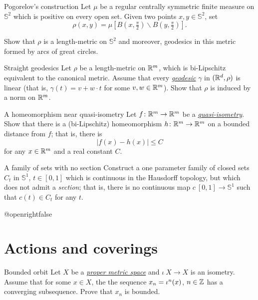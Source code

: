 \documentclass[twoside]{book}
\begin{document}
{\begin{pr}{}{Pogorelov's construction}\label{Pogorelov's construction}
Let $\mu$ be a regular centrally symmetric finite measure on $\mathbb{S}^2$ which is positive on every open set.
Given two points $x,y\in \mathbb{S}^2$,
set 
\[\rho(x,y)=\mu[B(x,\tfrac \pi2)\backslash B(y,\tfrac\pi2)].\]

Show that $\rho$ is a length-metric on $\mathbb{S}^2$
and moreover, geodesics in this metric formed by arcs of great circles.
\end{pr}

\begin{pr}{}{Straight geodesics}\label{Straight geodesics}
Let $\rho$ be a length-metric on $\mathbb{R}^m$, 
which is bi-Lipschitz equivalent to the canonical metric.
Assume that every \hyperref[Geodesic]{\emph{ge\-o\-de\-sic}} $\gamma$ in $(\mathbb{R}^d,\rho)$ is linear 
(that is, $\gamma(t)=v+w\cdot t$ for some $v,w\in\mathbb{R}^m$).
Show that $\rho$ is induced by a norm on $\mathbb{R}^m$.
\end{pr}

\begin{pr}{\thm}{A homeomorphism near quasi-isometry}\label{hom-near-QI} 
Let $f\colon\mathbb{R}^m\to\mathbb{R}^m$ be a \hyperref[Quasi-isometry]{\emph{quasi-isometry}}.
Show that there is a (bi-Lipschitz) homeomorphism 
$h\colon\mathbb{R}^m\to\mathbb{R}^m$ on a bounded distance from $f$;
that is, there is 
$$|f(x)-h(x)|\le C$$
for any $x\in\mathbb{R}^m$ and a real constant $C$.
\end{pr}

\begin{pr}{}{A family of sets with no section}\label{hausdorff-section} 
Construct a one parameter family of closed sets $C_t$ in $\mathbb{S}^1$, $t\in [0,1]$
which is continuous in the Hausdorff topology, 
but which does not admit a \emph{section};
that is, there is no continuous 
map $c\:[0,1]\to \mathbb{S}^1$ such that $c(t)\in C_t$ for any $t$.
\end{pr}





\csname @openrightfalse\endcsname
\chapter{Actions and coverings}


\begin{pr}{}{Bounded orbit}\label{Bounded orbit} Let $X$ be a 
\hyperref[Proper metric space]{\emph{proper metric space}} 
and $\iota\:X\to X$ is an isometry.
Assume that for some $x\in X$, the the sequence $x_n\z=\iota^n(x)$, $n\in\mathbb{Z}$ has a converging subsequence.
Prove that $x_n$ is bounded.
\end{pr}

}
\end{document}
